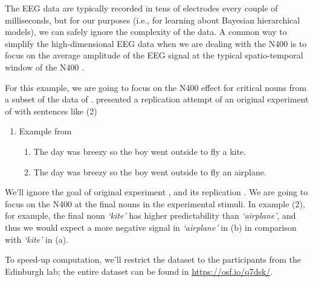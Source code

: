 \documentclass[12pt,]{krantz}
\newenvironment{Shaded}{\begin{snugshade}}{\end{snugshade}}
\newcommand{\KeywordTok}[1]{\textcolor[rgb]{0.13,0.29,0.53}{\textbf{#1}}}
\newcommand{\DataTypeTok}[1]{\textcolor[rgb]{0.13,0.29,0.53}{#1}}
\newcommand{\StringTok}[1]{\textcolor[rgb]{0.31,0.60,0.02}{#1}}
\newcommand{\CommentTok}[1]{\textcolor[rgb]{0.56,0.35,0.01}{\textit{#1}}}
\newcommand{\OperatorTok}[1]{\textcolor[rgb]{0.81,0.36,0.00}{\textbf{#1}}}
\newcommand{\NormalTok}[1]{#1}
\providecommand{\tightlist}{%
  \setlength{\itemsep}{0pt}\setlength{\parskip}{0pt}}
\theoremstyle{definition}
\theoremstyle{definition}
\theoremstyle{definition}
\theoremstyle{remark}
\begin{document}
The EEG data are typically recorded in tens of electrodes every couple
of milliseconds, but for our purposes (i.e., for learning about Bayesian
hierarchical models), we can safely ignore the complexity of the data. A
common way to simplify the high-dimensional EEG data when we are dealing
with the N400 is to focus on the average amplitude of the EEG signal at
the typical spatio-temporal window of the N400 \citep[see for
example][]{frankERPResponseAmount2015}.

For this example, we are going to focus on the N400 effect for critical
nouns from a subset of the data of
\citet{nieuwlandLargescaleReplicationStudy2018}.
\citet{nieuwlandLargescaleReplicationStudy2018} presented a replication
attempt of an original experiment of
\citet{delongProbabilisticWordPreactivation2005} with sentences like (2)

\begin{enumerate}
\def\labelenumi{\arabic{enumi}.}
\setcounter{enumi}{1}
\tightlist
\item
  Example from \citet{delongProbabilisticWordPreactivation2005}

  \begin{enumerate}
  \def\labelenumii{\alph{enumii}.}
  \tightlist
  \item
    The day was breezy so the boy went outside to fly a kite.
  \item
    The day was breezy so the boy went outside to fly an airplane.
  \end{enumerate}
\end{enumerate}

We'll ignore the goal of original experiment
\citep{delongProbabilisticWordPreactivation2005}, and its replication
\citep{nieuwlandLargescaleReplicationStudy2018}. We are going to focus
on the N400 at the final nouns in the experimental stimuli. In example
(2), for example, the final noun \emph{`kite'} has higher predictability
than \emph{`airplane'}, and thus we would expect a more negative signal
in \emph{`airplane'} in (b) in comparison with \emph{`kite'} in (a).

To speed-up computation, we'll restrict the dataset to the participants
from the Edinburgh lab; the entire dataset can be found in
\url{https://osf.io/q7dsk/}.

\begin{Shaded}
\end{Shaded}
\end{document}
